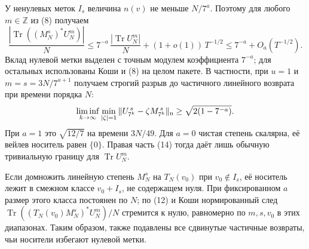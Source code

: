 \documentclass[11pt,a4paper]{article}
\newcommand{\Tr}{\operatorname{Tr}}
\newcommand{\Z}{\mathbb Z}
\begin{document}
У ненулевых меток $I_s$ величина $n(v)$ не меньше $N/7^a$. Поэтому для любого $m\in\Z$ из (8) получаем
\[
 \frac{|\Tr((M_N^s)^* U_N^m)|}{N}
     \le 7^{-a}\,\frac{|\Tr U_N^m|}{N}
                    +(1+o(1))\,T^{-1/2}
     \le 7^{-a}+O_a(T^{-1/2}).                                     \tag{14}
\]
Вклад нулевой метки выделен с точным модулем коэффициента $7^{-a}$; для остальных использованы Коши и (8) на целом пакете. В частности, при $u=1$ и $m=s=3N/7^{a+1}$ получаем строгий разрыв до частичного линейного возврата при времени порядка $N$:
\[
 \liminf_{k\to\infty}
         \min_{|\zeta|=1}\|U_{7^k}^{\,s}-\zeta M_{7^k}^{\,s}\|_{\rm n}
                                  \ge\sqrt{2(1-7^{-a})}.
\]
При $a=1$ это $\sqrt{12/7}$ на времени $3N/49$. Для $a=0$ чистая степень скалярна, её вейлев носитель равен $\{0\}$. Правая часть (14) тогда даёт лишь обычную тривиальную границу для $\Tr U_N^m$.

Если домножить линейную степень $M_N^s$ на $T_N(v_0)$ при $v_0\notin I_s$, её носитель лежит в смежном классе $v_0+I_s$, не содержащем нуля. При фиксированном $a$ размер этого класса постоянен по $N$; по (12) и Коши нормированный след $\Tr((T_N(v_0)M_N^s)^*U_N^m)/N$ стремится к нулю, равномерно по $m,s,v_0$ в этих диапазонах. Таким образом, также подавлены все сдвинутые частичные возвраты, чьи носители избегают нулевой метки.
\end{document}

